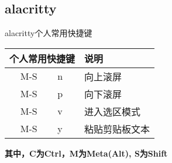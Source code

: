 \documentclass[11pt]{article}
\begin{document}
\newpage{}
\subsection{alacritty}
\begin{flushleft}
  alacritty个人常用快捷键
\end{flushleft}
\begin{left}
  \begin{tabular}{|c|l|l|}
    \hline
    \multicolumn{2}{|c|}{个人常用快捷键} & 说明 \\ 
    \hline
    M-S & n & 向上滚屏 \\
    M-S & p & 向下滚屏 \\
    M-S & v & 进入选区模式 \\
    M-S & y & 粘贴剪贴板文本 \\
    \hline
  \end{tabular}  
\end{left}
\begin{flushleft}
\textbf{其中，C为Ctrl，M为Meta(Alt), S为Shift}  
\end{flushleft}
\end{document}
